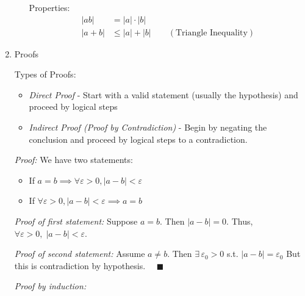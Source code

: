 \documentclass[12pt]{report}
\newcommand{\R}{\mathbb{R}}
\newcommand{\qed}{\quad \blacksquare}
\newcommand{\abs}[1]{\left\vert #1 \right\vert}
\newenvironment*{tbox}[2][gray]{
    \begin{tcolorbox}[
        parbox=false,
        colback=#1!5!white,
        colframe=#1!75!black,
        breakable,
        title={#2}
    ]}
    {\end{tcolorbox}}
\begin{document}
\begin{enumerate}
\begin{enumerate}
                Properties:
                \begin{align*}
                    \abs{ab} &= \abs{a} \cdot \abs{b}\\ 
                    \abs{a + b} &\leq \abs{a} + \abs{b} \qquad (\text{Triangle Inequality})
                \end{align*}
            \end{enumerate}

            \item Proofs 
            
            Types of Proofs:
            \begin{itemize}
                \item \emph{Direct Proof} - Start with a valid statement (usually the hypothesis) and proceed by logical steps 
                
                \item \emph{Indirect Proof (Proof by Contradiction)} - Begin by negating the conclusion and proceed by logical steps to a contradiction.
            \end{itemize}
            
            \begin{tbox}{\textbf{Theorem:} Let $a, b \in \R$. Then $a = b \iff \forall \varepsilon > 0, \abs{a - b} < \varepsilon$}
                \emph{Proof:} We have two statements:
                \begin{itemize}
                    \item If $a = b \implies \forall \varepsilon > 0, \abs{a - b} < \varepsilon$
                    \item If $\forall \varepsilon > 0, \abs{a - b} < \varepsilon \implies a = b$
                \end{itemize}

                \emph{Proof of first statement:} Suppose $a = b$. Then $\abs{a - b} = 0$. Thus, $\forall \varepsilon > 0,\; \abs{a - b} < \varepsilon$.

                \emph{Proof of second statement:} Assume $a \neq b$. Then $\exists\, \varepsilon_0 > 0$ s.t. $\abs{a - b} = \varepsilon_0$ But this is contradiction by hypothesis. $\qed$
            \end{tbox}

            \emph{Proof by induction:}


\end{enumerate}
\end{document}
